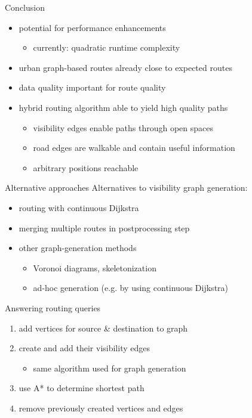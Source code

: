 \documentclass[xcolor={x11names}]{beamer}
\renewcommand{\n}{\hfill\\[0.5ex]}
\newcommand{\startBackupSlides}
{
	\appendix
	\renewcommand*\insertshorttitle
	{
		\makebox[0.94\textwidth]{\oldmacro\hfill Appendix -- (\insertframenumber)\,/\,\inserttotalframenumber}
	}
}
\begin{document}
		\begin{frame}{Conclusion}
			\begin{itemize}
				\item potential for performance enhancements
				\begin{itemize}
					\item currently: quadratic runtime complexity
				\end{itemize}
				\item urban graph-based routes already close to expected routes
				\item data quality important for route quality
				\item hybrid routing algorithm able to yield high quality paths
				\begin{itemize}
					\item visibility edges enable paths through open spaces
					\item road edges are walkable and contain useful information
					\item arbitrary positions reachable
				\end{itemize}
			\end{itemize}
		\end{frame}		
	
	\startBackupSlides
	
	\begin{frame}{Alternative approaches}
		Alternatives to visibility graph generation:\n
		\begin{itemize}
			\item routing with continuous Dijkstra
			\item merging multiple routes in postprocessing step
			\item other graph-generation methods
			\begin{itemize}
				\item Voronoi diagrams, skeletonization
				\item ad-hoc generation (e.g. by using continuous Dijkstra)
			\end{itemize}
		\end{itemize}
	\end{frame}
	
	\begin{frame}{Answering routing queries}
		\begin{enumerate}
			\item add vertices for source \& destination to graph
			\item create and add their visibility edges
			\begin{itemize}
				\item[\textrightarrow] same algorithm used for graph generation
			\end{itemize}
			\item use A* to determine shortest path
			\item remove previously created vertices and edges
		\end{enumerate}
	\end{frame}
	
\end{document}
